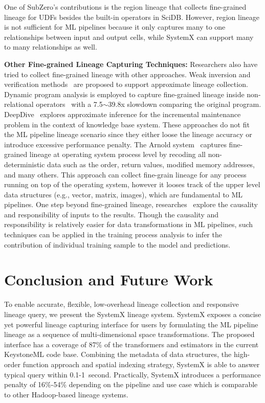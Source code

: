 \documentclass{sig-alternate}
\begin{document}
One of SubZero's contributions is the region lineage that collects fine-grained lineage for UDFs besides the built-in operators in SciDB. 
However, region lineage is not sufficient for ML pipelines because it only captures many to one relationships between input and output cells, 
while SystemX can support many to many relationships as well.

{\bf Other Fine-grained Lineage Capturing Techniques:} Researchers also have tried to collect fine-grained lineage with other approaches.
Weak inversion and verification methods~\cite{woodruff97} are proposed to support approximate lineage collection.
Dynamic program analysis is employed to capture fine-grained lineage inside non-relational operators~\cite{zhang07} with 
a 7.5$\sim$39.8x slowdown comparing the original program. 
DeepDive~\cite{shin15} explores approximate inference for the incremental maintenance problem in the context of knowledge base system.
These approaches do not fit the ML pipeline lineage scenario since they either loose the lineage accuracy or introduce
excessive performance penalty.
The Arnold system~\cite{devecsery14} captures fine-grained lineage at operating system process level by recoding
all non-deterministic data such as the order, return values, modified memory addresses, and many others. 
This approach can collect fine-grain lineage for any process running on top of the operating system, however
it looses track of the upper level data structures (e.g., vector, matrix, images), which are fundamental to ML pipelines.
One step beyond fine-grained lineage, researches~\cite{meliou10, meliou11} explore the causality and responsibility
of inputs to the results. Though the causality and responsibility is relatively easier for data transformations in ML pipelines,
such techniques can be applied in the training process analysis to infer the contribution of individual training sample to the 
model and predictions.


\section{Conclusion and Future Work}
\label{sec:Conclusion}
To enable accurate, flexible, low-overhead lineage collection and responsive lineage query, we present the SystemX lineage system.
SystemX exposes a concise yet powerful lineage capturing interface for users by formulating the ML pipeline lineage as a sequence
of multi-dimensional space transformations. The proposed interface has a coverage of 87\% of the transformers and estimators
in the current KeystoneML code base. Combining the metadata of data structures, the high-order function approach and spatial indexing
strategy, SystemX is able to answer typical query within 0.1-1~second. Practically, SystemX introduces a
performance penalty of 16\%-54\% depending on the pipeline and use case which is comparable to other Hadoop-based lineage systems.
\end{document}
